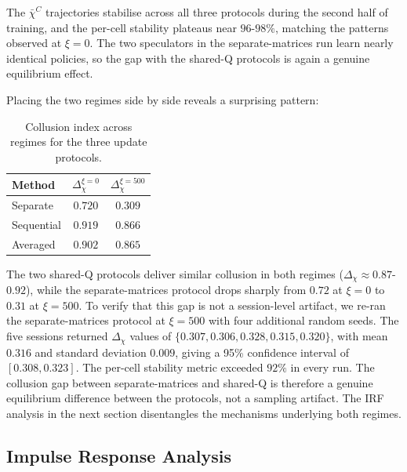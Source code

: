 \documentclass[11pt]{article}
\begin{document}
The $\bar{\chi}^C$ trajectories stabilise across all three protocols
during the second half of training, and the per-cell stability
plateaus near $96$-$98\%$, matching the patterns observed at $\xi=0$.
The two speculators in the separate-matrices run learn nearly identical
policies, so the gap with the
shared-Q protocols is again a genuine equilibrium effect.

Placing the two regimes side by side reveals a surprising pattern:

\begin{table}[H]
    \centering
    \begin{tabular}{lcc}
        \toprule
        Method & $\Delta_\chi^{\xi=0}$ & $\Delta_\chi^{\xi=500}$ \\
        \midrule
        Separate   & $0.720$ & $0.309$ \\
        Sequential & $0.919$ & $0.866$ \\
        Averaged   & $0.902$ & $0.865$ \\
        \bottomrule
    \end{tabular}
    \caption{Collusion index across regimes for the three update protocols.}
    \label{tab:xi_comparison}
\end{table}

The two shared-Q protocols deliver similar collusion in both regimes
($\Delta_\chi \approx 0.87$-$0.92$), while the separate-matrices protocol
drops sharply from $0.72$ at $\xi=0$ to $0.31$ at $\xi=500$. To verify that
this gap is not a session-level artifact, we re-ran the separate-matrices
protocol at $\xi=500$ with four additional random seeds. The five sessions
returned $\Delta_\chi$ values of $\{0.307, 0.306, 0.328, 0.315, 0.320\}$,
with mean $0.316$ and standard deviation $0.009$, giving a 95\% confidence
interval of $[0.308, 0.323]$. The per-cell stability metric exceeded
$92\%$ in every run. The collusion gap between separate-matrices and
shared-Q is therefore a genuine equilibrium difference between the
protocols, not a sampling artifact. The IRF analysis in the next section
disentangles the mechanisms underlying both regimes.

\subsection{Impulse Response Analysis}
\label{sec:irf}
\end{document}

